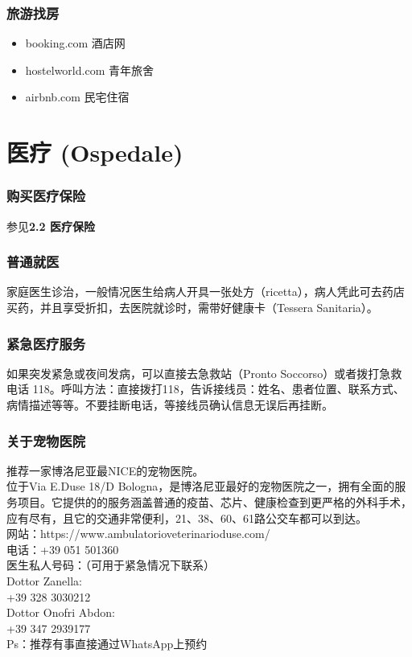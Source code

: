 \subsubsection{旅游找房}
\begin{itemize}
\item booking.com 酒店网
\item hostelworld.com 青年旅舍
\item airbnb.com 民宅住宿
\end{itemize} 


\section{医疗 (Ospedale)}


\subsubsection{购买医疗保险}
参见\textbf{2.2 医疗保险} 

\subsubsection{普通就医}
家庭医生诊治，一般情况医生给病人开具一张处方（ricetta），病人凭此可去药店买药，并且享受折扣，去医院就诊时，需带好健康卡（Tessera Sanitaria）。
\subsubsection{紧急医疗服务}

如果突发紧急或夜间发病，可以直接去急救站（Pronto Soccorso）或者拨打急救电话 118。呼叫方法：直接拨打118，告诉接线员：姓名、患者位置、联系方式、病情描述等等。不要挂断电话，等接线员确认信息无误后再挂断。
\subsubsection{关于宠物医院}
推荐一家博洛尼亚最NICE的宠物医院。\\
位于Via E.Duse 18/D Bologna，是博洛尼亚最好的宠物医院之一，拥有全面的服务项目。它提供的的服务涵盖普通的疫苗、芯片、健康检查到更严格的外科手术，应有尽有，且它的交通非常便利，21、38、60、61路公交车都可以到达。\\
网站：https://www.ambulatorioveterinarioduse.com/\\
电话：+39 051 501360\\
医生私人号码：（可用于紧急情况下联系）\\
Dottor Zanella:\\
+39 328 3030212\\
Dottor Onofri Abdon:\\
+39 347 2939177\\
Ps：推荐有事直接通过WhatsApp上预约\\
\\
\\
